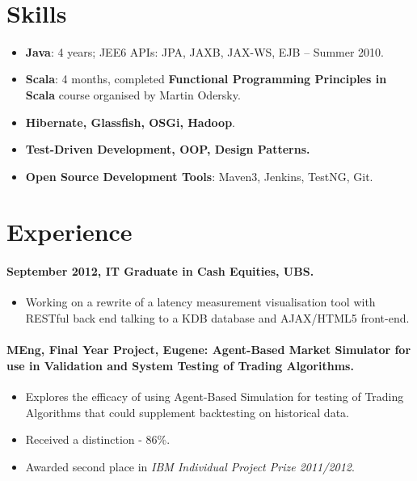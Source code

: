 \documentclass[11pt, a4paper]{article}
\newlength{\wideitemsep}
\let\olditem\item
\renewcommand{\item}{\setlength{\itemsep}{\wideitemsep}\olditem}
\begin{document}
\textsf{\\[0.1in]}


\section*{Skills}
\begin{itemize}
\item \textbf{Java}: 4 years; JEE6 APIs: JPA, JAXB, JAX-WS, EJB – Summer 2010.
\item \textbf{Scala}: 4 months, completed \textbf{Functional Programming Principles in Scala} course organised by Martin Odersky. 
\item \textbf{Hibernate, Glassfish, OSGi, Hadoop}.
\item \textbf{Test-Driven Development, OOP, Design Patterns.}
\item \textbf{Open Source Development Tools}: Maven3, Jenkins, TestNG, Git.
\end{itemize}

\section*{Experience}

\paragraph{September 2012, IT Graduate in Cash Equities, UBS.}
\begin{itemize}
\item Working on a rewrite of a latency measurement visualisation tool with RESTful back end talking to a KDB database and AJAX/HTML5 front-end.  
\end{itemize}

\paragraph{MEng, Final Year Project, Eugene: Agent-Based Market Simulator for use in Validation and System Testing of Trading Algorithms.} 
\begin{itemize}
\item Explores the efficacy of using Agent-Based Simulation for testing of Trading Algorithms that could supplement backtesting on historical data.
\item Received a distinction - 86\%.
\item Awarded second place in \textit{IBM Individual Project Prize 2011/2012}.
\end{itemize}
\end{document}
